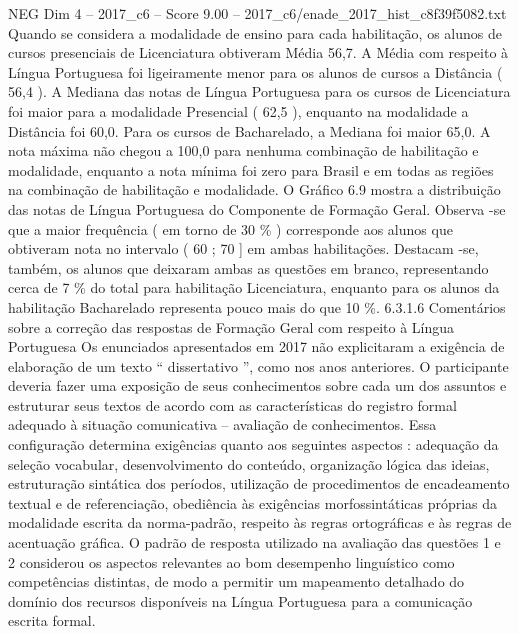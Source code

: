 \begin{textsample}{NEG Dim 4 – 2017\_c6 – Score 9.00 – 2017\_c6/enade\_2017\_hist\_c8f39f5082.txt}
Quando se considera a modalidade de ensino para cada habilitação, os alunos de cursos presenciais de Licenciatura obtiveram Média 56,7.
A Média com respeito à Língua Portuguesa foi ligeiramente menor para os alunos de cursos a Distância ( 56,4 ).
A Mediana das notas de Língua Portuguesa para os cursos de Licenciatura foi maior para a modalidade Presencial ( 62,5 ), enquanto na modalidade a Distância foi 60,0.
Para os cursos de Bacharelado, a Mediana foi maior 65,0.
A nota máxima não chegou a 100,0 para nenhuma combinação de habilitação e modalidade, enquanto a nota mínima foi zero para Brasil e em todas as regiões na combinação de habilitação e modalidade.
O Gráfico 6.9 mostra a distribuição das notas de Língua Portuguesa do Componente de Formação Geral.
Observa -se que a maior frequência ( em torno de 30 \% ) corresponde aos alunos que obtiveram nota no intervalo ( 60 ; 70 ] em ambas habilitações.
Destacam -se, também, os alunos que deixaram ambas as questões em branco, representando cerca de 7 \% do total para habilitação Licenciatura, enquanto para os alunos da habilitação Bacharelado representa pouco mais do que 10 \%. 6.3.1.6 Comentários sobre a correção das respostas de Formação Geral com respeito à Língua Portuguesa Os enunciados apresentados em 2017 não explicitaram a exigência de elaboração de um texto “ dissertativo ”, como nos anos anteriores.
O participante deveria fazer uma exposição de seus conhecimentos sobre cada um dos assuntos e estruturar seus textos de acordo com as características do registro formal adequado à situação comunicativa – avaliação de conhecimentos.
Essa configuração determina exigências quanto aos seguintes aspectos : adequação da seleção vocabular, desenvolvimento do conteúdo, organização lógica das ideias, estruturação sintática dos períodos, utilização de procedimentos de encadeamento textual e de referenciação, obediência às exigências morfossintáticas próprias da modalidade escrita da norma-padrão, respeito às regras ortográficas e às regras de acentuação gráfica.
O padrão de resposta utilizado na avaliação das questões 1 e 2 considerou os aspectos relevantes ao bom desempenho linguístico como competências distintas, de modo a permitir um mapeamento detalhado do domínio dos recursos disponíveis na Língua Portuguesa para a comunicação escrita formal.

\end{textsample}
